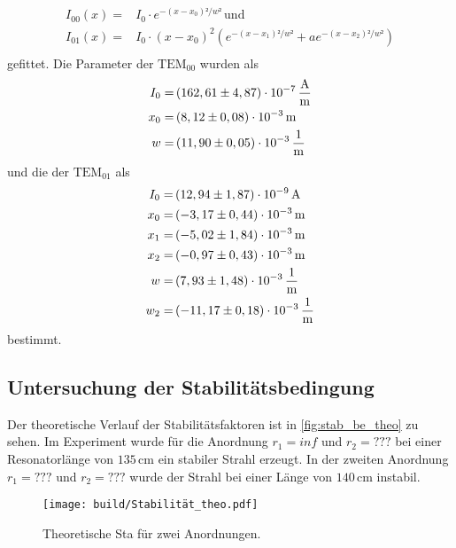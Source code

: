 \begin{align*}
    I_{00}(x) =& I_0 \cdot e^{-(x-x_0)²/w ²} \, \text{und} \\
    I_{01}(x) =& I_0 \cdot (x-x_{0})^2 \left( e^{-(x-x_1)²/w ²} + a e^{-(x-x_2)²/w ²} \right) \\
\end{align*}
gefittet.
Die Parameter der $\text{TEM}_{00}$  wurden als 
\begin{align*}
   I_0 =& \left( 162,61 \pm 4,87 \right) \cdot 10^{-7} \, \dfrac{\unit{\ampere}}{\unit{\meter}} \\
   x_0 =& \left( 8,12   \pm 0,08 \right) \cdot 10^{-3} \, \unit{\meter}                         \\
   w   =& \left(11,90   \pm 0,05 \right) \cdot 10^{-3} \, \unit{\dfrac{1}{\meter}}              \\
\end{align*}
und die der $\text{TEM}_{01}$ als
\begin{align*}
    I_0 =& \left( 12,94  \pm 1,87 \right) \cdot 10^{-9} \, \unit{\ampere}           \\
    x_0 =& \left( -3,17  \pm 0,44 \right) \cdot 10^{-3} \, \unit{\meter}            \\
    x_1 =& \left( -5,02  \pm 1,84 \right) \cdot 10^{-3} \, \unit{\meter}            \\
    x_2 =& \left( -0,97  \pm 0,43 \right) \cdot 10^{-3} \, \unit{\meter}            \\
    w   =& \left(  7,93  \pm 1,48 \right) \cdot 10^{-3} \, \unit{\dfrac{1}{\meter}} \\
    w_2 =& \left(-11,17  \pm 0,18 \right) \cdot 10^{-3} \, \unit{\dfrac{1}{\meter}} \\
 \end{align*}
 bestimmt.

\subsection{Untersuchung der Stabilitätsbedingung}
\label{sec:Stab_be}
Der theoretische Verlauf der Stabilitätsfaktoren ist in \autoref{fig:stab_be_theo} zu sehen.
Im Experiment wurde für die Anordnung $r_1 = inf$ und $r_2 = ???$ bei einer Resonatorlänge von $135 \, \unit{\centi\meter}$ ein stabiler Strahl erzeugt.
In der zweiten Anordnung $r_1 = ???$ und $r_2 = ???$ wurde der Strahl bei einer Länge von $140 \, \unit{\centi\meter}$ instabil.
 \begin{figure}[H]
    \centering
    \texttt{[image: build/Stabilität\_theo.pdf]}
    \caption{Theoretische Sta für zwei Anordnungen.}
    \label{fig:stab_be_theo}
\end{figure}


